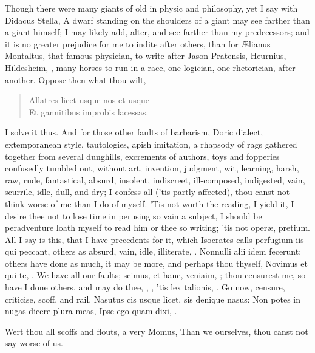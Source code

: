 {Though there were many giants of old in physic and philosophy, yet I
say with Didacus Stella, A dwarf standing on the shoulders of a
giant may see farther than a giant himself; I may likely add, alter,
and see farther than my predecessors; and it is no greater prejudice
for me to indite after others, than for \AE{}lianus Montaltus, that famous
physician, to write  after Jason Pratensis, Heurnius,
Hildesheim, \etc, many horses to run in a race, one logician, one
rhetorician, after another. Oppose then what thou wilt,
\begin{verse}
\textlatin{Allatres licet usque nos et usque}\\
\textlatin{Et gannitibus improbis lacessas.}\\
\end{verse}

I solve it thus. And for those other faults of barbarism, Doric
dialect, extemporanean style, tautologies, apish imitation, a rhapsody
of rags gathered together from several dunghills, excrements of
authors, toys and fopperies confusedly tumbled out, without art,
invention, judgment, wit, learning, harsh, raw, rude, fantastical,
absurd, insolent, indiscreet, ill-composed, indigested, vain, scurrile,
idle, dull, and dry; I confess all ('tis partly affected), thou canst
not think worse of me than I do of myself. 'Tis not worth the reading,
I yield it, I desire thee not to lose time in perusing so vain a
subject, I should be peradventure loath myself to read him or thee so
writing; 'tis not oper\ae{}, pretium. All I say is this, that I have
precedents for it, which Isocrates calls perfugium iis qui
peccant, others as absurd, vain, idle, illiterate, \etc. Nonnulli alii
idem fecerunt; others have done as much, it may be more, and perhaps
thou thyself, Novimus et qui te, \etc. We have all our faults; scimus, et
hanc, veniaim, \etc; thou censurest me, so have I done others, and
may do thee, , \etc, 'tis lex talionis, .
Go now, censure, criticise, scoff, and rail.
Nasutus cis usque licet, sis denique nasus:
Non potes in nugas dicere plura meas,
Ipse ego quam dixi, \etc.

Wert thou all scoffs and flouts, a very Momus,
Than we ourselves, thou canst not say worse of us.

}
